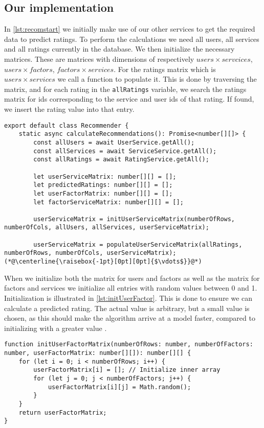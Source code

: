 \subsection{Our implementation}
In \autoref{lst:recomstart} we initially make use of our other services to get the required data to predict ratings.
To perform the calculations we need all users, all services and all ratings currently in the database.
We then initialize the necessary matrices.
These are matrices with dimensions of respectively $users \times servcices$, $users \times factors$, $factors \times services$. 
For the ratings matrix which is $users \times services$ we call a function to populate it.
This is done by traversing the matrix, and for each rating in the \texttt{allRatings} variable, we search the ratings matrix for ids corresponding to the service and user ids of that rating.
If found, we insert the rating value into that entry.
\begin{lstlisting}[caption={The start of the recommender}, captionpos=b, label={lst:recomstart}]
export default class Recommender {
    static async calculateRecommendations(): Promise<number[][]> {
        const allUsers = await UserService.getAll();
        const allServices = await ServiceService.getAll();
        const allRatings = await RatingService.getAll();
    
        let userServiceMatrix: number[][] = [];
        let predictedRatings: number[][] = [];
        let userFactorMatrix: number[][] = [];
        let factorServiceMatrix: number[][] = [];

        userServiceMatrix = initUserServiceMatrix(numberOfRows, numberOfCols, allUsers, allServices, userServiceMatrix);

		userServiceMatrix = populateUserServiceMatrix(allRatings, numberOfRows, numberOfCols, userServiceMatrix);
(*@\centerline{\raisebox{-1pt}[0pt][0pt]{$\vdots$}}@*)
\end{lstlisting}
When we initialize both the matrix for users and factors as well as the matrix for factors and services we initialize all entries with random values between 0 and 1.
Initialization is illustrated in \autoref{lst:initUserFactor}.
This is done to ensure we can calculate a predicted rating.
The actual value is arbitrary, but a small value is chosen, as this should make the algorithm arrive at a model faster, compared to initializing with a greater value \cite{FunkMatrixFactorization}.
\begin{lstlisting}[caption={Initializing the user and factor matrix}, captionpos=b, label={lst:initUserFactor}]
function initUserFactorMatrix(numberOfRows: number, numberOfFactors: number, userFactorMatrix: number[][]): number[][] {
    for (let i = 0; i < numberOfRows; i++) {
        userFactorMatrix[i] = []; // Initialize inner array
        for (let j = 0; j < numberOfFactors; j++) {
            userFactorMatrix[i][j] = Math.random();
        }
    }   
    return userFactorMatrix;
}
\end{lstlisting}
